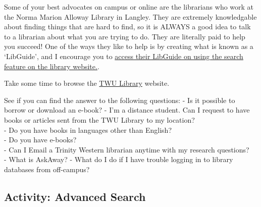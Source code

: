 \documentclass[
]{book}
\theoremstyle{definition}
\theoremstyle{definition}
\theoremstyle{definition}
\theoremstyle{definition}
\theoremstyle{remark}
\begin{document}
\begin{reflect}
Some of your best advocates on campus or online are the librarians who work at the Norma Marion Alloway Library in Langley. They are extremely knowledgable about finding things that are hard to find, so it is ALWAYS a good idea to talk to a librarian about what you are trying to do. They are literally paid to help you succeed! One of the ways they like to help is by creating what is known as a `LibGuide', and I encourage you to \href{https://libguides.twu.ca/LibraryOneSearch}{access their LibGuide on using the search feature on the library website.}.

Take some time to browse the \href{https://www.twu.ca/academics/library}{TWU Library} website.

See if you can find the answer to the following questions:
- Is it possible to borrow or download an e-book?
- I'm a distance student. Can I request to have books or articles sent from the TWU Library to my location?\\
- Do you have books in languages other than English?\\
- Do you have e-books?\\
- Can I Email a Trinity Western librarian anytime with my research questions?\\
- What is AskAway?
- What do I do if I have trouble logging in to library databases from off-campus?
\end{reflect}

\hypertarget{activity-advanced-search}{%
\subsection*{Activity: Advanced Search}\label{activity-advanced-search}}
\end{document}
